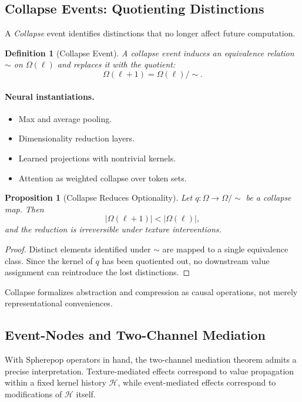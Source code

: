 \documentclass[11pt]{article}
\newtheorem{definition}{Definition}
\newtheorem{proposition}{Proposition}
\theoremstyle{remark}
\newcommand{\Hist}{\mathcal{H}}
\begin{document}
\subsection{Collapse Events: Quotienting Distinctions}

A \emph{Collapse} event identifies distinctions that no longer affect
future computation.

\begin{definition}[Collapse Event]
A collapse event induces an equivalence relation $\sim$ on
$\Omega(\ell)$ and replaces it with the quotient:
\[
\Omega(\ell+1) = \Omega(\ell)/{\sim}.
\]
\end{definition}

\paragraph{Neural instantiations.}
\begin{itemize}
\item Max and average pooling.
\item Dimensionality reduction layers.
\item Learned projections with nontrivial kernels.
\item Attention as weighted collapse over token sets.
\end{itemize}

\begin{proposition}[Collapse Reduces Optionality]
Let $q : \Omega \to \Omega/{\sim}$ be a collapse map. Then
\[
|\Omega(\ell+1)| < |\Omega(\ell)|,
\]
and the reduction is irreversible under texture interventions.
\end{proposition}

\begin{proof}
Distinct elements identified under $\sim$ are mapped to a single
equivalence class. Since the kernel of $q$ has been quotiented out,
no downstream value assignment can reintroduce the lost distinctions.
\end{proof}

Collapse formalizes abstraction and compression as causal operations,
not merely representational conveniences.

\subsection{Event-Nodes and Two-Channel Mediation}

With Spherepop operators in hand, the two-channel mediation theorem
admits a precise interpretation. Texture-mediated effects correspond
to value propagation within a fixed kernel history $\Hist$, while
event-mediated effects correspond to modifications of $\Hist$ itself.
\end{document}
